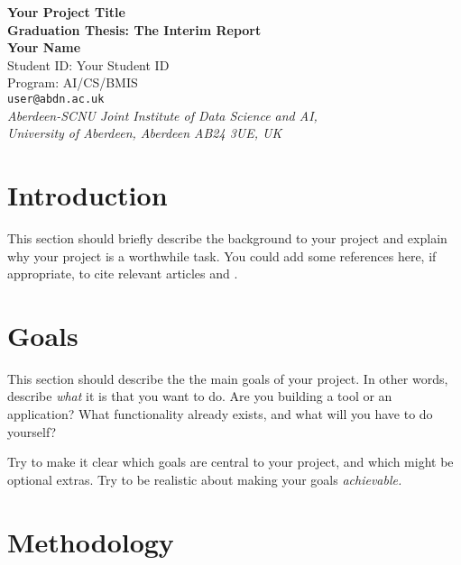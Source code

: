 \documentclass[a4paper,12pt]{article}
\begin{document}
\begin{center}
{\Large\bf{Your Project Title}} \\
      \vspace{5.0mm}
{\Large\bf{Graduation Thesis: The Interim Report}} \\
      \vspace{8mm}
      {\large\bf{Your Name}}  \\
      {\large{Student ID: Your Student ID}}  \\
      {\large{Program: AI/CS/BMIS}}  \\
      \vspace{5.0mm}
       {\tt user@abdn.ac.uk} \\
      \vspace{5.0mm}
      {\em Aberdeen-SCNU Joint Institute of Data Science and AI,\\
       University of Aberdeen, Aberdeen AB24 3UE, UK} 
\end{center}


\section*{Introduction}

This section should briefly describe the background to your
project and explain why your project is a worthwhile task.
You could add some references here, if appropriate, to cite 
relevant articles
\cite{wooldridge2002,shoham95} and \cite{garcia-camino2005}.

\section*{Goals}

This section should describe the the main goals of your project.
In other words, describe {\em what} it is that you want to do.
Are you building a tool or an application? What functionality 
already exists, and what will you have to do yourself?

Try to make it clear which goals are central to your project, and which
might be optional extras. Try to be realistic about making your
goals {\em achievable.}


\section*{Methodology}
\end{document}
